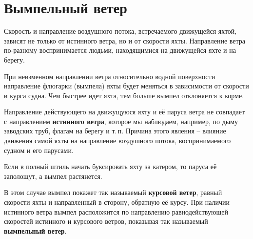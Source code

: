\documentclass[a4paper, 12pt, twoside, final]{scrbook}
\begin{document}
\section{Вымпельный ветер}

Скорость и направление воздушного потока, встречаемого движущейся яхтой, зависят не только от истинного ветра, но и от скорости яхты.
Направление ветра по-разному воспринимается людьми, находящимися на движущейся яхте и на берегу.

При неизменном направлении ветра относительно водной поверхности направление флюгарки (вымпела) яхты будет меняться в зависимости от скорости и курса судна. Чем быстрее идет яхта, тем больше вымпел отклоняется к корме.

Направление действующего на движущуюся яхту и её паруса ветра не совпадает с направлением \textbf{истинного ветра}, которое мы наблюдаем, например, по дыму заводских труб, флагам на берегу и т.\,п. Причина этого явления \--- влияние движения самой яхты на направление воздушного потока, воспринимаемого судном и его парусами.

Если в полный штиль начать буксировать яхту за катером, то паруса её заполощут, а вымпел растянется.

В этом случае вымпел покажет так называемый \textbf{курсовой ветер}, равный скорости яхты и направленный в сторону, обратную её курсу. При наличии истинного ветра вымпел расположится по направлению равнодействующей скоростей истинного и курсового ветров, показывая так называемый \textbf{вымпельный ветер}.
\end{document}
